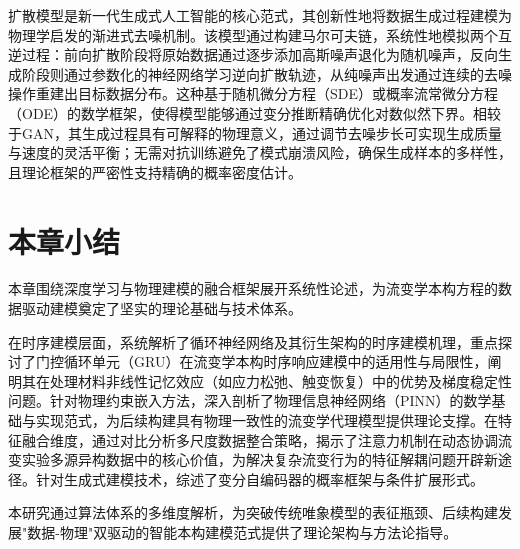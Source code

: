 扩散模型是新一代生成式人工智能的核心范式，其创新性地将数据生成过程建模为物理学启发的渐进式去噪机制\cite{ho2020denoising}。该模型通过构建马尔可夫链，系统性地模拟两个互逆过程：前向扩散阶段将原始数据通过逐步添加高斯噪声退化为随机噪声，反向生成阶段则通过参数化的神经网络学习逆向扩散轨迹，从纯噪声出发通过连续的去噪操作重建出目标数据分布。这种基于随机微分方程（SDE）或概率流常微分方程（ODE）的数学框架，使得模型能够通过变分推断精确优化对数似然下界\cite{song2020score}。相较于GAN，其生成过程具有可解释的物理意义，通过调节去噪步长可实现生成质量与速度的灵活平衡；无需对抗训练避免了模式崩溃风险，确保生成样本的多样性，且理论框架的严密性支持精确的概率密度估计\cite{Cao2024Survey}。
\section{本章小结}
本章围绕深度学习与物理建模的融合框架展开系统性论述，为流变学本构方程的数据驱动建模奠定了坚实的理论基础与技术体系。

在时序建模层面，系统解析了循环神经网络及其衍生架构的时序建模机理，重点探讨了门控循环单元（GRU）在流变学本构时序响应建模中的适用性与局限性，阐明其在处理材料非线性记忆效应（如应力松弛、触变恢复）中的优势及梯度稳定性问题。针对物理约束嵌入方法，深入剖析了物理信息神经网络（PINN）的数学基础与实现范式，为后续构建具有物理一致性的流变学代理模型提供理论支撑。在特征融合维度，通过对比分析多尺度数据整合策略，揭示了注意力机制在动态协调流变实验多源异构数据中的核心价值，为解决复杂流变行为的特征解耦问题开辟新途径。针对生成式建模技术，综述了变分自编码器的概率框架与条件扩展形式。

本研究通过算法体系的多维度解析，为突破传统唯象模型的表征瓶颈、后续构建发展"数据-物理"双驱动的智能本构建模范式提供了理论架构与方法论指导。